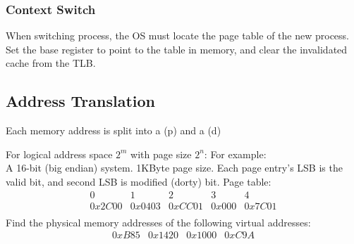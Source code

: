 \documentclass{report}
\begin{document}
        \subsubsection*{Context Switch}
            When switching process, the OS must locate the page table of the new process. Set the base register to point to the table in memory, and clear the invalidated cache from the TLB.
    
        \subsection*{Address Translation}
            Each memory address is split into a (p) and a (d)
            \begin{itemize}
            \end{itemize}
            For logical address space $2^m$ with page size $2^n$:
            For example:
            \\ A 16-bit (big endian) system. 1KByte page size. Each page entry's LSB is the valid bit, and second LSB is modified (dorty) bit.
            Page table:
            \[\begin{matrix}
                0      & 1      & 2      & 3     & 4 \\
                0x2C00 & 0x0403 & 0xCC01 & 0x000 & 0x7C01 \\
            \end{matrix}\]
            Find the physical memory addresses of the following virtual addresses:
            \[\begin{matrix}
                0xB85 & 0x1420 & 0x1000 & 0xC9A \\
            \end{matrix}\]
\end{document}
